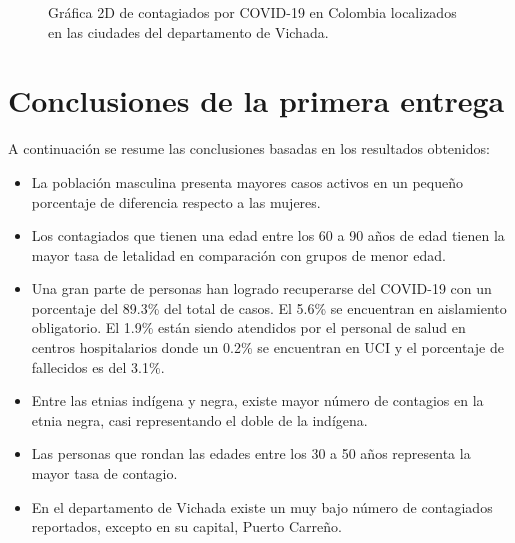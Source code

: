 \documentclass[conference,compsoc,onecolumn]{IEEEtran}
\begin{document}
\begin{figure}[htbp]
\centering
{}
\caption{Gráfica 2D de contagiados por COVID-19 en Colombia localizados en las ciudades del departamento de Vichada.} 
\label{fig:lego}
\end{figure}

\section{Conclusiones de la primera entrega}
A continuación se resume las conclusiones basadas en los resultados obtenidos: 
\label{sec:conclusions}
\begin{itemize}
    
    \item La población masculina presenta mayores casos activos en un pequeño porcentaje de diferencia respecto a las mujeres.
    \item Los contagiados que tienen una edad entre los 60 a 90 años de edad tienen la mayor tasa de letalidad en comparación con grupos de menor edad. 
    \item Una gran parte de personas han logrado recuperarse del COVID-19 con un porcentaje del 89.3\% del total de casos. El 5.6\% se encuentran en aislamiento obligatorio. El 1.9\% están siendo atendidos por el personal de salud en centros hospitalarios donde un 0.2\% se encuentran en UCI y el porcentaje de fallecidos es del 3.1\%.
    \item Entre las etnias indígena y negra, existe mayor número de contagios en la etnia negra, casi representando el doble de la indígena.
    \item Las personas que rondan las edades entre los 30 a 50 años representa la mayor tasa de contagio.
    \item En el departamento de Vichada existe un muy bajo número de contagiados reportados, excepto en su capital, Puerto Carreño.
    
\end{itemize}
\end{document}
